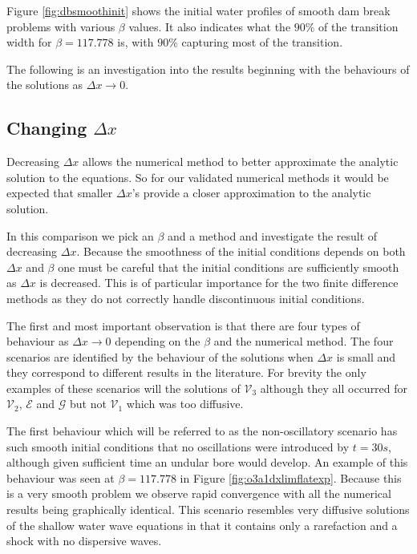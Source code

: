 \documentclass[SingleSpace,12pt,Journal]{Serre_ASCE}
\begin{document}
Figure \ref{fig:dbsmoothinit} shows the initial water profiles of smooth dam break problems with various $\beta$ values. It also indicates what the  $90 \%$ of the transition width for $\beta = 117.778$ is, with $90 \%$ capturing most of the transition. 

The following is an investigation into the results beginning with the behaviours of the solutions as $\Delta x  \rightarrow 0$. 

\subsection{Changing $\Delta x$}
Decreasing $\Delta x$ allows the numerical method to better approximate the analytic solution to the equations. So for our validated numerical methods it would be expected that smaller $\Delta x$'s provide a closer approximation to the analytic solution.

In this comparison we pick an $\beta$ and a method and investigate the result of decreasing $\Delta x$. Because the smoothness of the initial conditions depends on both $\Delta x$ and $\beta$ one must be careful that the initial conditions are sufficiently smooth as $\Delta x$ is decreased. This is of particular importance for the two finite difference methods as they do not correctly handle discontinuous initial conditions.

The first and most important observation is that there are four types of behaviour as $\Delta x \rightarrow 0$ depending on the $\beta$ and the numerical method. The four scenarios are identified by the behaviour of the solutions when $\Delta x$ is small and they correspond to different results in the literature. For brevity the only examples of these scenarios will the solutions of $\mathcal{V}_3$ although they all occurred for $\mathcal{V}_2$, $\mathcal{E}$ and $\mathcal{G}$ but not $\mathcal{V}_1$ which was too diffusive.

The first behaviour which will be referred to as the non-oscillatory scenario has such smooth initial conditions that no oscillations were introduced by $t= 30s$, although given sufficient time an undular bore would develop. An example of this behaviour was seen at $\beta = 117.778$ in Figure \ref{fig:o3a1dxlimflatexp}. Because this is a very smooth problem we observe rapid convergence with all the numerical results being graphically identical. This scenario resembles very diffusive solutions of the shallow water wave equations in that it contains only a rarefaction and a shock with no dispersive waves. 
\end{document}

